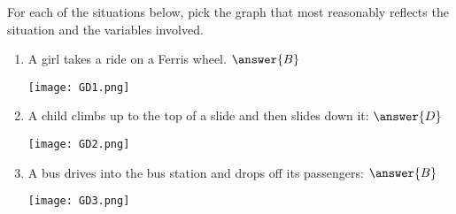 \documentclass{ximera}
\author{Vic Ferdinand, Betsy McNeal, Jenny Sheldon}
\begin{document}
\begin{exercise}
For each of the situations below, pick the graph that most reasonably
reflects the situation and the variables involved.

\begin{enumerate}
\item \label{graphicDetailsC} A girl takes a ride on a Ferris wheel. $\answer{B}$

 \begin{image}
\texttt{[image: GD1.png]}
 \end{image}



\item \label{graphicDetailsD} A child climbs up to the top of a slide and then slides down it: $\answer{D}$

 \begin{image}
\texttt{[image: GD2.png]}
 \end{image}
\item \label{graphicDetailsE} A bus drives into the bus station and drops off its passengers: $\answer{B}$
 \begin{image}
\texttt{[image: GD3.png]}
 \end{image}

\end{enumerate}





\end{exercise}
\end{document}
